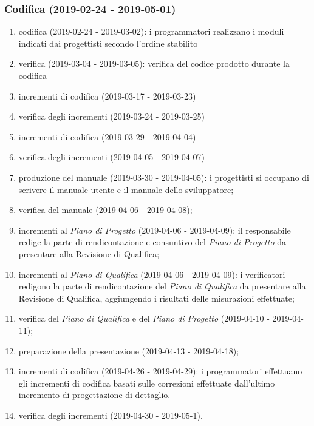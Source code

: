 		\subsubsection{Codifica (2019-02-24 - 2019-05-01)}
			\begin{enumerate}[label= 4.2.\arabic*)]
				\item codifica (2019-02-24 - 2019-03-02): i programmatori realizzano i moduli indicati dai progettisti secondo l'ordine stabilito
				\item verifica (2019-03-04 - 2019-03-05): verifica del codice prodotto durante la codifica
				\item incrementi di codifica (2019-03-17 - 2019-03-23)
				\item verifica degli incrementi (2019-03-24 - 2019-03-25)
				\item incrementi di codifica (2019-03-29 - 2019-04-04)
				\item verifica degli incrementi (2019-04-05 - 2019-04-07)
				\item produzione del manuale (2019-03-30 - 2019-04-05): i progettisti si occupano di scrivere il manuale utente e il manuale dello sviluppatore;
				\item verifica del manuale (2019-04-06 - 2019-04-08);
				\item incrementi al \textit{Piano di Progetto} (2019-04-06 - 2019-04-09): il responsabile redige la parte di rendicontazione e consuntivo del \textit{Piano di Progetto} da presentare alla Revisione di Qualifica;
				\item incrementi al \textit{Piano di Qualifica} (2019-04-06 - 2019-04-09): i verificatori redigono la parte di rendicontazione del \textit{Piano di Qualifica} da presentare alla Revisione di Qualifica, aggiungendo i risultati delle misurazioni effettuate;
				\item verifica del \textit{Piano di Qualifica} e del \textit{Piano di Progetto} (2019-04-10 - 2019-04-11);
				\item preparazione della presentazione (2019-04-13 - 2019-04-18);
				\item incrementi di codifica (2019-04-26 - 2019-04-29): i programmatori effettuano gli incrementi di codifica basati sulle correzioni effettuate dall'ultimo incremento di progettazione di dettaglio.
				\item verifica degli incrementi (2019-04-30 - 2019-05-1).
			\end{enumerate}
		
